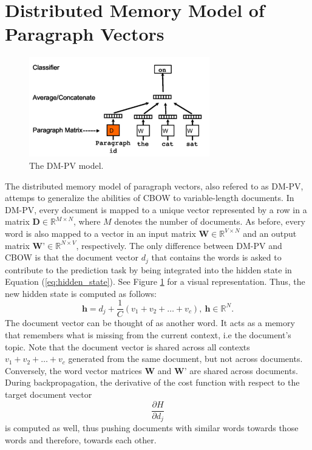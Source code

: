 \documentclass[english]{lni}
\begin{document}
\section{Distributed Memory Model of Paragraph Vectors}
\begin{figure}[H]
    \centering
    \includegraphics[width=0.70\textwidth]{images/doc2vec-arch.PNG}
    \caption{The DM-PV model.}
    \label{fig:doc2vec-arch}
\end{figure}
The distributed memory model of paragraph vectors, also refered to as DM-PV, attemps to generalize the abilities of CBOW to variable-length documents.
In DM-PV, every document is mapped to a unique vector represented by a row in a matrix $\textbf{D} \in \mathbb{R}^{M \times N}$, where 
$M$ denotes the number of documents. 
As before, every word is also mapped to a vector in an input matrix $\textbf{W} \in \mathbb{R}^{V \times N}$ and an output matrix $\textbf{W'} \in \mathbb{R}^{N \times V}$, respectively. 
The only difference between DM-PV and CBOW is that the document vector $d_{j}$ that 
contains the words is asked to contribute to the prediction task 
by being integrated into the hidden state in Equation (\ref{eq:hidden_state}).
See Figure \ref{fig:doc2vec-arch} for a visual representation. 
Thus, the new hidden state is computed as follows: 
\begin{equation}
    \textbf{h} = d_j + \frac{1}{C}(v_1 + v_2 + \hdots + v_c ), \:
    \textbf{h} \in \mathbb{R}^{N}.
\end{equation}
The document vector can be thought of as another word. It acts as a memory that remembers 
what is missing from the current context, i.e the document's topic. 
Note that the document vector is shared across all contexts $v_1 + v_2 + \hdots + v_c$ 
generated from the same document, but not across documents.
Conversely, the word vector matrices $\textbf{W}$ and $\textbf{W'}$ are shared across documents. 
During backpropagation, the derivative of the cost function with respect to the target document vector 
\begin{equation}
\frac{\partial H}{\partial d_{j}}
\end{equation}
is computed as well, thus pushing documents with similar words towards those words and therefore, towards each other.  
\end{document}
